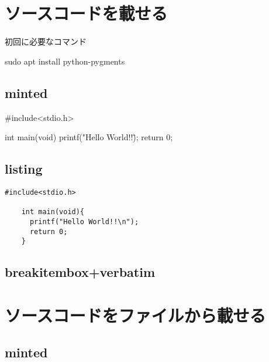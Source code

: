 \documentclass[a4j,titlepage]{ltjsarticle}   %
\begin{document}
  \section{ソースコードを載せる}
  \begin{listing}[htbp]
    \caption{初回に必要なコマンド}
    \begin{shellcode}
      sudo apt install python-pygments
    \end{shellcode}
  \end{listing}
  \subsection{minted}
  \begin{myMinted}
    #include<stdio.h>

    int main(void){
      printf("Hello World!!\");
      return 0;
    }
  \end{myMinted}

  \subsection{listing}
  \begin{lstlisting}[caption=listingのテスト,label=listTest]
    #include<stdio.h>

    int main(void){
      printf("Hello World!!\n");
      return 0;
    }
  \end{lstlisting}

  \subsection{breakitembox+verbatim}



\section{ソースコードをファイルから載せる}
\subsection{minted}
\end{document}
